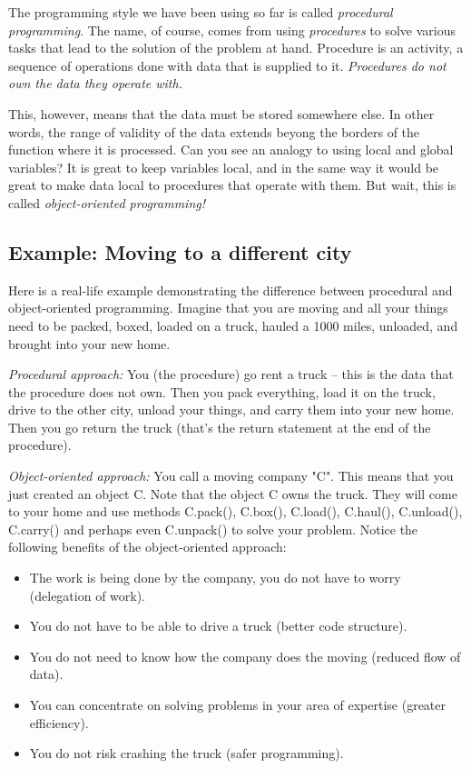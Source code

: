 \documentclass[article,A4,12pt]{llncs}
\begin{document}
The programming style we have been using so far is called {\em procedural programming}.
The name, of course, comes from using {\em procedures} to solve various tasks that 
lead to the solution of the problem at hand. Procedure is an activity, a sequence of operations 
done with data that is supplied to it. {\em Procedures do not own the data they 
operate with.} 

This, however, means that the data must be stored somewhere else. In other
words, the range of validity of the data extends beyong the borders of the 
function where it is processed. 
Can you see an analogy to using local and global variables? It is great
to keep variables local, and in the same way it would be great to make
data local to procedures that operate with them. But wait, this is called {\em 
object-oriented programming!}

\subsection{Example: Moving to a different city}

Here is a real-life example demonstrating the difference between 
procedural and object-oriented programming. Imagine that you are moving 
and all your things need to be packed, boxed, loaded on a truck, hauled 
a 1000 miles, unloaded, and brought into your new home. 

{\em Procedural approach:} You (the procedure) 
go rent a truck -- this is the data that the procedure does not own. Then
you pack everything, load it on the truck, drive to the other city, 
unload your things, and carry them into your new home. Then you go 
return the truck (that's the return statement at the end of the procedure).

{\em Object-oriented approach:} You call a moving company "C". This means 
that you just created an object C. Note that the 
object C owns the truck. They will come to your home and use methods 
C.pack(), C.box(), C.load(), C.haul(), C.unload(), C.carry() and perhaps 
even C.unpack() to solve your problem. Notice the following benefits of the object-oriented approach: 
\begin{itemize}
\item The work is being done by the company, 
      you do not have to worry (delegation of work).
\item You do not have to be able to drive a truck (better code structure). 
\item You do not need to know how the company does the moving (reduced flow of data).
\item You can concentrate on solving problems 
      in your area of expertise (greater efficiency).
\item You do not risk crashing the truck (safer programming).
\end{itemize}
\end{document}
